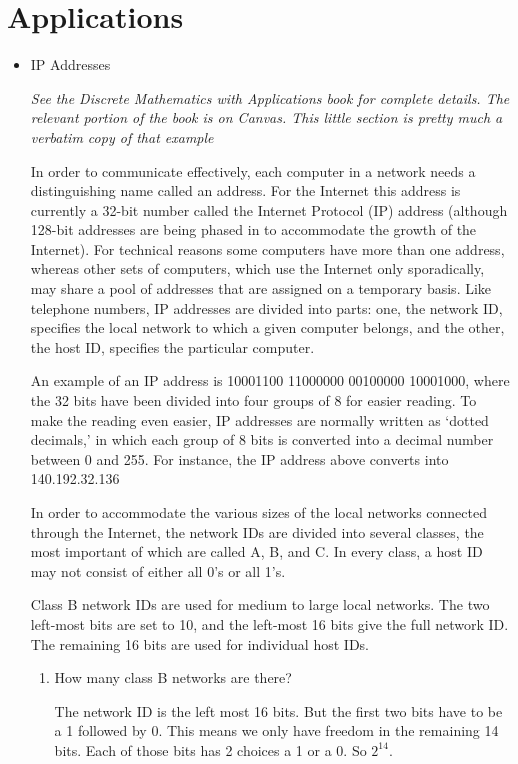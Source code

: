 \documentclass[12pt]{article}
\begin{document}
\section*{Applications}
\begin{itemize}
\item IP Addresses

\emph{See the Discrete Mathematics with Applications book for complete details. The relevant portion of the book is on Canvas. This little section is pretty much a verbatim copy of that example}

In order to communicate effectively, each computer in a network needs a distinguishing name called an address. For the Internet this address is currently a 32-bit number called the Internet Protocol (IP) address (although 128-bit addresses are being phased in to accommodate the growth of the Internet). For technical reasons some computers have more than one address, whereas other sets of computers, which use the Internet only sporadically, may share a pool of addresses that are assigned on a temporary basis. Like telephone numbers, IP addresses are divided into parts: one, the network ID, speciﬁes the local network to which a given computer belongs, and the other, the host ID, speciﬁes the particular computer.

An example of an IP address is 10001100 11000000 00100000 10001000, where the 32 bits have been divided into four groups of 8 for easier reading. To make the reading even easier, IP addresses are normally written as `dotted decimals,' in which each group of 8 bits is converted into a decimal number between 0 and 255. For instance, the IP address above converts into 140.192.32.136

In order to accommodate the various sizes of the local networks connected through the Internet, the network IDs are divided into several classes, the most important of which are called A, B, and C. In every class, a host ID may not consist of either all 0’s or all 1’s.

Class B network IDs are used for medium to large local networks. The two left-most bits are set to 10, and the left-most 16 bits give the full network ID. The remaining 16 bits are used for individual host IDs.

\begin{enumerate}
\item How many class B networks are there?

The network ID is the left most 16 bits. But the first two bits have to be a 1 followed by 0. This means we only have freedom in the remaining 14 bits. Each of those bits has 2 choices a 1 or a 0. So $2^{14}$.


\end{enumerate}
\end{itemize}
\end{document}
